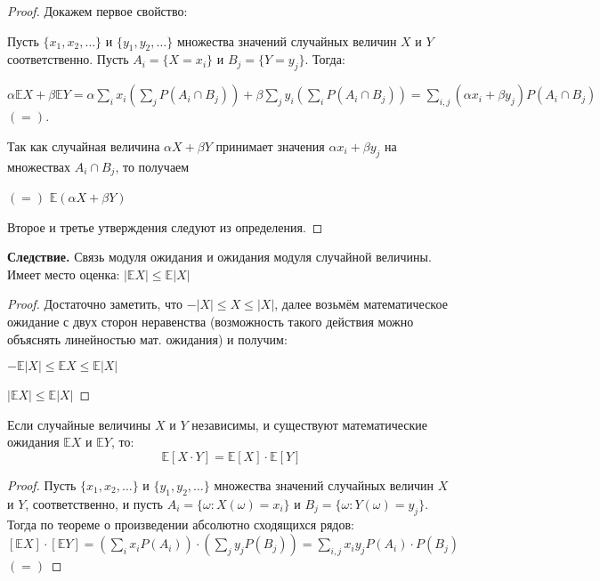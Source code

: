 \documentclass[a4paper]{article}
\begin{document}
\begin{colloq}
   	
   	\begin{proof}
   		Докажем первое свойство:
   		
   		Пусть $\{ x_1, x_2, \dots \}$ и $\{ y_1, y_2, \dots \}$ множества значений случайных величин $X$ и $Y$ соответственно. Пусть $A_i=\{ X = x_i \}$ и $B_j=\{ Y  =y_j \}$. Тогда:
   		
   		$\alpha \mathbb{E}X + \beta \mathbb{E}Y = \alpha \sum_{i} x_i \left( \sum_{j} P(A_i \cap B_j) \right) + \beta \sum_{j} y_i \left( \sum_{i} P(A_i \cap B_j) \right) = \sum_{i, j} (\alpha x_i + \beta y_j) P(A_i \cap B_j)$ $(=)$.
   		
   		Так как случайная величина $\alpha X + \beta Y$ принимает значения $\alpha x_i + \beta y_j$ на множествах $A_i \cap B_j$, то получаем 
   		
   		$(=)$ $\mathbb{E}(\alpha X + \beta Y)$
   		
   		Второе и третье утверждения следуют из определения.
   	\end{proof}
   	
   	\textbf{Следствие.} Связь модуля ожидания и ожидания модуля случайной величины. \\
   		Имеет место оценка: $|\mathbb{E}X| \leqslant \mathbb{E}|X|$
   	\begin{proof}
   		Достаточно заметить, что $-|X|\leqslant X \leqslant |X|$, далее возьмём математическое ожидание с двух сторон неравенства (возможность такого действия можно объяснять линейностью мат. ожидания) и получим:
   		 
   		$-\mathbb{E}|X| \leqslant \mathbb{E}X \leqslant \mathbb{E}|X|$
   		
		$|\mathbb{E}X| \leqslant \mathbb{E}|X|$
   	\end{proof}
   	
   	\begin{theorem*}
   		Если случайные величины $X$ и $Y$ независимы, и существуют математические ожидания $\mathbb{E}X$ и $\mathbb{E}Y$, то: \[ \mathbb{E}[X \cdot Y] = \mathbb{E}[X] \cdot \mathbb{E}[Y] \] 
   	\end{theorem*}
   	
   	\begin{proof}
   		Пусть $\{ x_1, x_2, \dots \}$ и $\{ y_1, y_2, \dots \}$ множества значений случайных величин $X$ и $Y$, соответственно, и пусть $A_i=\{ \omega: X(\omega)=x_i \}$ и $B_j=\{ \omega: Y(\omega)=y_j \}$. Тогда по теореме о произведении абсолютно сходящихся рядов: $[\mathbb{E}X] \cdot [\mathbb{E}Y] = \left( \sum_{i} x_i P(A_i) \right) \cdot \left( \sum_{j} y_j P(B_j) \right) = \sum_{i,j} x_i y_j P(A_i) \cdot P(B_j)$ $(=)$ 
   		

\end{proof}
\end{colloq}
\end{document}

